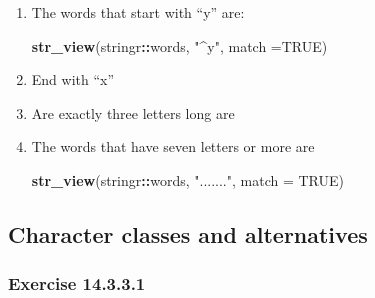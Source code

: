 \documentclass[]{book}
\newenvironment{Shaded}{\begin{snugshade}}{\end{snugshade}}
\newcommand{\DataTypeTok}[1]{\textcolor[rgb]{0.13,0.29,0.53}{#1}}
\newcommand{\KeywordTok}[1]{\textcolor[rgb]{0.13,0.29,0.53}{\textbf{#1}}}
\newcommand{\NormalTok}[1]{#1}
\newcommand{\OperatorTok}[1]{\textcolor[rgb]{0.81,0.36,0.00}{\textbf{#1}}}
\newcommand{\OtherTok}[1]{\textcolor[rgb]{0.56,0.35,0.01}{#1}}
\newcommand{\StringTok}[1]{\textcolor[rgb]{0.31,0.60,0.02}{#1}}
\theoremstyle{plain}
\theoremstyle{remark}
\begin{document}
\begin{enumerate}
\def\labelenumi{\arabic{enumi}.}
\item
  The words that start with ``y'' are:

\begin{Shaded}
\begin{Highlighting}[]
\KeywordTok{str_view}\NormalTok{(stringr}\OperatorTok{::}\NormalTok{words, }\StringTok{"^y"}\NormalTok{, }\DataTypeTok{match =}\OtherTok{TRUE}\NormalTok{)}
\end{Highlighting}
\end{Shaded}
\item
  End with ``x''

\begin{Shaded}
\end{Shaded}
\item
  Are exactly three letters long are

\begin{Shaded}
\end{Shaded}
\item
  The words that have seven letters or more are

\begin{Shaded}
\begin{Highlighting}[]
\KeywordTok{str_view}\NormalTok{(stringr}\OperatorTok{::}\NormalTok{words, }\StringTok{"......."}\NormalTok{, }\DataTypeTok{match =} \OtherTok{TRUE}\NormalTok{)}
\end{Highlighting}
\end{Shaded}
\end{enumerate}

\hypertarget{character-classes-and-alternatives}{%
\subsection{Character classes and
alternatives}\label{character-classes-and-alternatives}}

\hypertarget{exercise-14.3.3.1}{%
\subsubsection*{\texorpdfstring{Exercise
{14.3.3.1}}{Exercise 14.3.3.1}}\label{exercise-14.3.3.1}}
\end{document}
